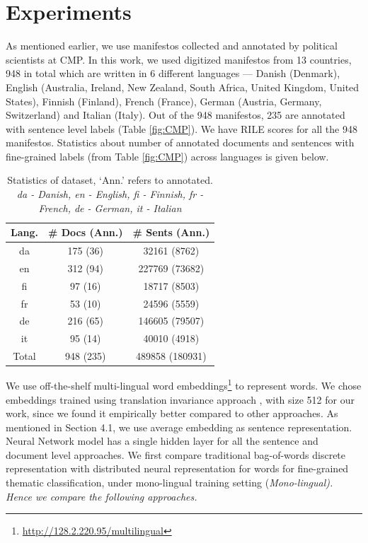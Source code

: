 \documentclass[11pt,a4paper]{article}
\begin{document}

\section{Experiments}
As mentioned earlier, we use manifestos collected and annotated by political scientists at CMP. In this work, we used digitized manifestos from 13 countries, 948 in total which are written in 6 different languages --- Danish (Denmark), English (Australia, Ireland, New Zealand, South Africa, United Kingdom, United States), Finnish (Finland), French (France), German (Austria, Germany, Switzerland) and Italian (Italy). Out of the 948 manifestos, 235 are annotated with sentence level labels (Table \ref{fig:CMP}). We have RILE scores for all the 948 manifestos. Statistics about number of annotated documents and sentences with fine-grained labels (from Table \ref{fig:CMP}) across languages is given below.
 \begin{table}[!htp]
  \centering
  \begin{tabular}{ c c c }
  \toprule
    Lang. & \# Docs (Ann.) & \# Sents (Ann.)\\
    \midrule
    da  & 175 (36)  &  32161 (8762)	\\
    en   &  312 (94)& 227769 (73682) 	 \\    	
    fi  &  97 (16) &  18717 (8503) \\
    fr    & 53 (10) & 24596 (5559)\\
    de    & 216 (65) & 146605 (79507) \\
    it    & 95 (14)  & 40010 (4918)\\
\midrule
 Total    & 948 (235)  & 489858 (180931)\\
    \bottomrule

  \end{tabular}
  \caption{Statistics of dataset, `Ann.' refers to annotated. \textit{da - Danish, en - English, fi - Finnish, fr - French, de - German, it - Italian}}
  \label{tab:al}
\end{table}

We use off-the-shelf multi-lingual word embeddings\footnote{\url{http://128.2.220.95/multilingual}} to represent words. We chose embeddings trained using translation invariance approach \cite{ammar2016massively}, with size 512 for our work, since we found it empirically better compared to other approaches. As mentioned in Section 4.1, we use average embedding as sentence representation. Neural Network model has a single hidden layer for all the sentence and document level approaches. We first compare traditional bag-of-words discrete representation with distributed neural representation for words for fine-grained thematic classification, under mono-lingual training setting (\em{Mono-lingual}). \rm Hence we compare the following approaches. 
\end{document}
